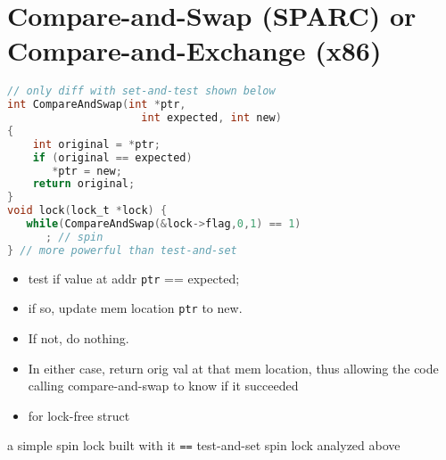 \section*{Compare-and-Swap (SPARC) or Compare-and-Exchange (x86)}
\begin{minipage}{.65\linewidth}
\begin{lstlisting}[language=c]
// only diff with set-and-test shown below
int CompareAndSwap(int *ptr,
                     int expected, int new)
{
    int original = *ptr;
    if (original == expected)
       *ptr = new;
    return original;
}
void lock(lock_t *lock) {
   while(CompareAndSwap(&lock->flag,0,1) == 1)
      ; // spin
} // more powerful than test-and-set
\end{lstlisting}
\end{minipage}
\begin{minipage}{.35\linewidth}
  \flushleft
  \begin{itemize}
  \item test if value at addr \texttt{ptr} == expected;
  \item if so, update mem location \texttt{ptr} to new.
  \item If not, do nothing.
  \item In either case, return orig val at that mem location, thus allowing the code calling compare-and-swap to know if it succeeded
  \item for lock-free struct
  \end{itemize}
\end{minipage}
a simple spin lock built with it \texttt{==} test-and-set spin lock analyzed above
